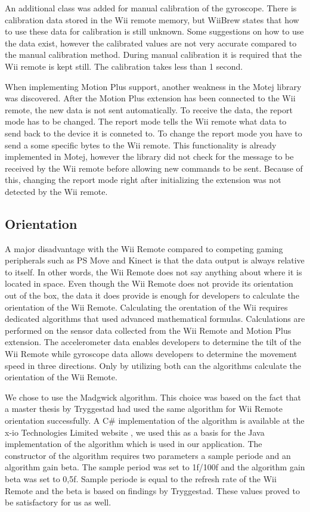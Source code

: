 An additional class was added for manual calibration of the gyroscope. There is calibration data stored in the Wii remote memory, but WiiBrew states that how to use these data for calibration is still unknown. Some suggestions on how to use the data exist, however the calibrated values are not very accurate compared to the manual calibration method. During manual calibration it is required that the Wii remote is kept still. The calibration takes less than 1 second.

When implementing Motion Plus support, another weakness in the Motej library was discovered. After the Motion Plus extension has been connected to the Wii remote, the new data is not sent automatically. To receive the data, the report mode has to be changed. The report mode tells the Wii remote what data to send back to the device it is conneted to. To change the report mode you have to send a some specific bytes to the Wii remote. This functionality is already implemented in Motej, however the library did not check for the message to be received by the Wii remote before allowing new commands to be sent. Because of this, changing the report mode right after initializing the extension was not detected by the Wii remote.

\subsection{Orientation}
A major disadvantage with the Wii Remote compared to competing gaming peripherals such as PS Move and Kinect is that the data output is always relative to itself. In other words, the Wii Remote does not say anything about where it is located in space. Even though the Wii Remote does not provide its orientation out of the box, the data it does provide is enough for developers to calculate the orientation of the Wii Remote. Calculating the orentation of the Wii requires dedicated algorithms that used advanced mathematical formulas. Calculations are performed on the sensor data collected from the Wii Remote and Motion Plus extension. The accelerometer data enables developers to determine the tilt of the Wii Remote while gyroscope data allows developers to determine the movement speed in three directions. Only by utilizing both can the algorithms calculate the orientation of the Wii Remote.

We chose to use the Madgwick algorithm\cite{madgwick}. This choice was based on the fact that a master thesis by Tryggestad\cite{Tryggestad} had used the same algorithm for Wii Remote orientation successfully. A C\# implementation of the algorithm is available at the x-io Technologies Limited website \cite{opensourceMadgwick}, we used this as a basis for the Java implementation of the algorithm which is used in our application. The constructor of the algorithm requires two parameters a sample periode and an algorithm gain beta. The sample period was set to 1f/100f and the algorithm gain beta was set to 0,5f. Sample periode is equal to the refresh rate of the Wii Remote and the beta is based on findings by Tryggestad. These values proved to be satisfactory for us as well.

